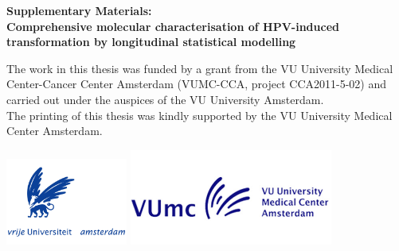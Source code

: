 \documentclass[notitlepage,twoside,10pt,openright,leqno]{Classes/PhDThesisPSnPDF} %
\begin{document}
\frontmatter





\thispagestyle{empty}
\begin{center}
\vspace{2.5cm}
  {\bf\fontsize{16pt}{1em}\selectfont Supplementary Materials:\\
  Comprehensive molecular characterisation of HPV-induced transformation by longitudinal statistical modelling\\}
  \vspace{2.5cm}
\end{center}

\newpage
\thispagestyle{empty}
\noindent The work in this thesis was funded by a grant from the VU University Medical Center-Cancer Center Amsterdam (VUMC-CCA, project CCA2011-5-02) and carried out under the auspices of the VU University Amsterdam.\\

\noindent The printing of this thesis was kindly supported by the VU University Medical Center Amsterdam.\\
\begin{center}
	\null\hspace{\fill}
  	\includegraphics[width=0.30\textwidth]{VU.png}%
  	\null\hspace{2cm}
  	\includegraphics[width=0.50\textwidth]{VUmc.jpg}
  	\hspace{\fill}\null
\end{center}
\null
\end{document}
